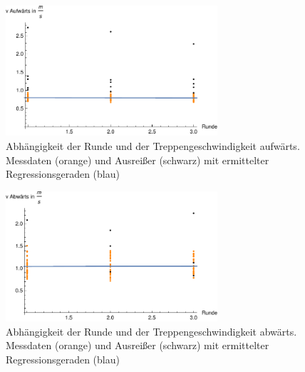 \begin{figure}[htpb]
	\centering
	\includegraphics[width=0.7\textwidth]{abbildungen/regression/2012_2017_verbund/ohneausreisser/auf-runde.pdf}
	
	\caption{Abhängigkeit der Runde und der Treppengeschwindigkeit aufwärts. Messdaten (orange) und Ausreißer (schwarz) mit ermittelter Regressionsgeraden (blau)}
	\label{fig:2012_und_2017_MA_auf_runde}
\end{figure}

\begin{figure}[htpb]
	\centering
	\includegraphics[width=0.7\textwidth]{abbildungen/regression/2012_2017_verbund/ohneausreisser/ab-runde.pdf}
	
	\caption{Abhängigkeit der Runde und der Treppengeschwindigkeit abwärts. Messdaten (orange) und Ausreißer (schwarz) mit ermittelter Regressionsgeraden (blau)}
	\label{fig:2012_und_2017_MA_ab_runde}
\end{figure}

